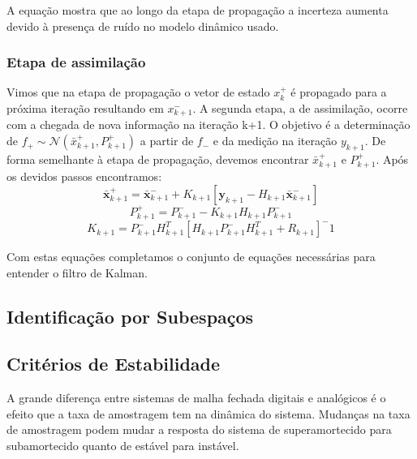 A equação mostra que ao longo da etapa de propagação a incerteza aumenta devido à presença de ruído no modelo dinâmico usado.

\subsubsection{Etapa de assimilação}
Vimos que na etapa de propagação o vetor de estado $x^+_k$ é propagado para a próxima iteração resultando em $x^-_{k+1}$. A segunda etapa, a de assimilação, ocorre com a chegada de nova informação na iteração k+1. O objetivo é a determinação de $f_+ \sim \mathcal{N} (\bar{x}^+_{k+1},P^+_{k+1})$ a partir de $f_-$ e da medição na iteração $y_{k+1}$. De forma semelhante à etapa de propagação, devemos encontrar $\bar{x}^+_{k+1}$ e $P^+_{k+1}$. Após os devidos passos encontramos:
\begin{equation}
\bar{\mathbf{x}}^+_{k+1}=\bar{\mathbf{x}}^-_{k+1}+K_{k+1}[\mathbf{y}_{k+1}-H_{k+1} \bar{\mathbf{x}} ^-_{k+1}]
\end{equation}
\begin{equation}
P^+_{k+1}=P^-_{k+1}-K_{k+1} H_{k+1} P^-_{k+1}
\end{equation}
\begin{equation}
K_{k+1}=P^-_{k+1} H^T_{k+1}[H_{k+1} P^-_{k+1} H^T_{k+1}+R_{k+1}]^-1
\end{equation}

Com estas equações completamos o conjunto de equações necessárias para entender o filtro de Kalman.
\subsection {Identificação por Subespaços}

\subsection{Critérios de Estabilidade}
A grande diferença entre sistemas de malha fechada digitais e analógicos é o efeito que a taxa de amostragem tem na dinâmica do sistema. Mudanças na taxa de amostragem podem mudar a resposta do sistema de superamortecido para subamortecido quanto de estável para instável. 

















